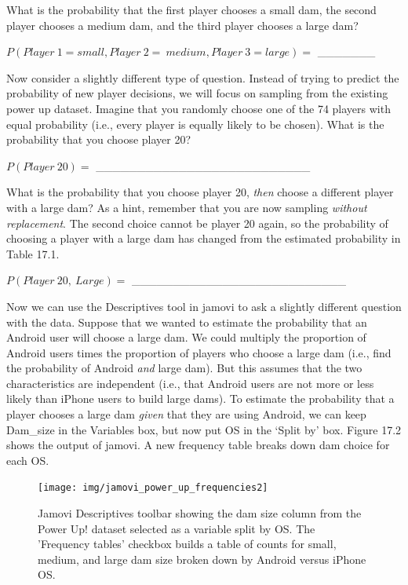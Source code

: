 \documentclass[
  openany]{krantz}
\begin{document}
What is the probability that the first player chooses a small dam, the second player chooses a medium dam, and the third player chooses a large dam?

\(P(Player\:1 = small,Player\:2 = \:medium,Player\:3 = large) =\) \_\_\_\_\_\_\_

Now consider a slightly different type of question.
Instead of trying to predict the probability of new player decisions, we will focus on sampling from the existing power up dataset.
Imagine that you randomly choose one of the 74 players with equal probability (i.e., every player is equally likely to be chosen).
What is the probability that you choose player 20?

\(P(Player\:20) =\) \_\_\_\_\_\_\_\_\_\_\_\_\_\_\_\_\_\_\_\_\_\_\_\_\_\_

What is the probability that you choose player 20, \emph{then} choose a different player with a large dam?
As a hint, remember that you are now sampling \emph{without replacement}.
The second choice cannot be player 20 again, so the probability of choosing a player with a large dam has changed from the estimated probability in Table 17.1.

\(P(Player\:20,\:Large) =\) \_\_\_\_\_\_\_\_\_\_\_\_\_\_\_\_\_\_\_\_\_\_\_\_\_\_

Now we can use the Descriptives tool in jamovi to ask a slightly different question with the data.
Suppose that we wanted to estimate the probability that an Android user will choose a large dam.
We could multiply the proportion of Android users times the proportion of players who choose a large dam (i.e., find the probability of Android \emph{and} large dam).
But this assumes that the two characteristics are independent (i.e., that Android users are not more or less likely than iPhone users to build large dams).
To estimate the probability that a player chooses a large dam \emph{given} that they are using Android, we can keep Dam\_size in the Variables box, but now put OS in the `Split by' box.
Figure 17.2 shows the output of jamovi.
A new frequency table breaks down dam choice for each OS.

\begin{figure}
\texttt{[image: img/jamovi\_power\_up\_frequencies2]} \caption{Jamovi Descriptives toolbar showing the dam size column from the Power Up! dataset selected as a variable split by OS. The 'Frequency tables' checkbox builds a table of counts for small, medium, and large dam size broken down by Android versus iPhone OS.}\label{fig:unnamed-chunk-66}
\end{figure}
\end{document}
